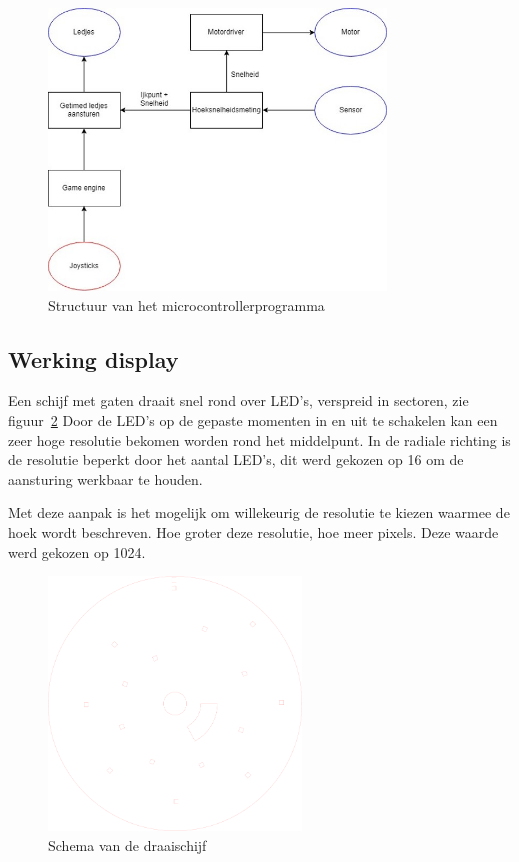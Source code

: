 \documentclass[a4paper, 12pt]{article}
\begin{document}
\begin{figure}
  \centering
  \includegraphics[width=0.8\textwidth]{img/structuur.jpg}
  \caption{Structuur van het microcontrollerprogramma}
  \label{fig:structuur}
\end{figure}


\subsection{Werking display}
Een schijf met gaten draait snel rond over LED's, verspreid in sectoren, zie figuur~\ref{fig:schijf}
Door de LED's op de gepaste momenten in en uit te schakelen
kan een zeer hoge resolutie bekomen worden rond het middelpunt.
In de radiale richting is de resolutie beperkt door het aantal LED's,
dit werd gekozen op 16 om de aansturing werkbaar te houden.

Met deze aanpak is het mogelijk om willekeurig de resolutie te kiezen
waarmee de hoek wordt beschreven. Hoe groter deze resolutie,
hoe meer pixels. Deze waarde werd gekozen op 1024.

\begin{figure}
  \centering
  \includegraphics[width=0.6\textwidth]{img/schijf.png}
  \caption{Schema van de draaischijf}
  \label{fig:schijf}
\end{figure}
\end{document}
